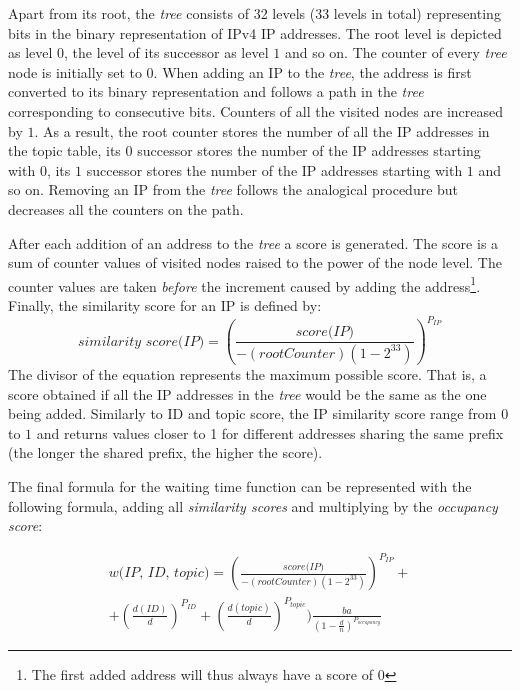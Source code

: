 Apart from its root,  the \emph{tree} consists of 32 levels (33 levels in total) representing bits in the binary representation of IPv4 IP addresses. 
The root level is depicted as level $0$, the level of its successor as level $1$ and so on. 
The counter of every \emph{tree} node is initially set to $0$. When adding an IP to the \emph{tree},  the address is first converted to its binary representation and follows a path in the \emph{tree} corresponding to consecutive bits. 
Counters of all the visited nodes are increased by $1$. 
As a result, the root counter stores the number of all the IP addresses in the topic table, its $0$ successor stores the number of the IP addresses starting with $0$, its $1$ successor stores the number of the IP addresses starting with $1$ and so on. 
Removing an IP from the \emph{tree} follows the analogical procedure but decreases all the counters on the path. 

After each addition of an address to the \emph{tree} a score is generated.
The score is a sum of counter values of visited nodes raised to the power of the node level. 
The counter values are taken \emph{before} the increment caused by adding the address\footnote{The first added address will thus always have a score of $0$}. 
Finally,  the similarity score for an IP is defined by:
\begin{equation}
    \textit{similarity score(IP}) = (\frac{\textit{score(IP)}}{-(\textit{rootCounter})(1 - 2^{33})})^{P_\textit{IP}}
\end{equation}
The divisor of the equation represents the maximum possible score. 
That is, a score obtained if all the IP addresses in the \emph{tree} would be the same as the one being added. 
Similarly to ID and topic score,  the IP similarity score range from $0$ to $1$ and returns values closer to 1 for different addresses sharing the same prefix (the longer the shared prefix, the higher the score).

The final formula for the waiting time function can be represented with  the following formula,  adding all \emph{similarity scores} and multiplying by the \emph{occupancy score}:

\begin{equation}
\begin{split}
    \textit{w(IP, ID, topic)} = 
    (\frac{\textit{score(IP)}}{-(\textit{rootCounter})(1 - 2^{33})})^{P_\textit{IP}} + \\
    + (\frac{d(ID)}{d})^{P_{ID}} +
    (\frac{d(topic)}{d})^{P_{topic}})
    \frac{ba}{(1-\frac{d}{n})^{P_{occupancy}}}
\end{split}
\end{equation}

